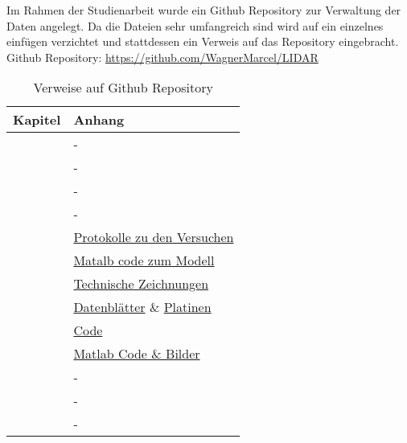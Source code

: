 \newpage
{}
Im Rahmen der Studienarbeit wurde ein Github Repository zur Verwaltung der Daten angelegt. Da die Dateien sehr umfangreich sind wird auf ein einzelnes einfügen verzichtet und stattdessen ein Verweis auf das Repository eingebracht.\\
Github Repository: \href{https://github.com/WagnerMarcel/LIDAR}{https://github.com/WagnerMarcel/LIDAR}
\begin{table}[H]
	\centering
	\caption{Verweise auf Github Repository}
	\begin{tabular}{|l|l|}
		\hline
		\textbf{Kapitel} & \textbf{Anhang} \\\hline
		\fullref{chap:einleitung} & - \\\hline
		\fullref{chap:grundlagen_et} & - \\\hline
		\fullref{chap:grund_lidar} & - \\\hline
		\fullref{chap:stand_der_technik} & -\\\hline
		\fullref{chap:machbarkeitsstudie} & \href{https://github.com/WagnerMarcel/LIDAR/tree/master/04_Protokolle}{Protokolle zu den Versuchen} \\\hline
		\fullref{chap:matlab_modell} & \href{https://github.com/WagnerMarcel/LIDAR/tree/master/06_Matlab\%20Modell}{Matalb code zum Modell} \\\hline
		\fullref{chap:mechanik} & \href{https://github.com/WagnerMarcel/LIDAR/tree/master/08_Mechanik}{Technische Zeichnungen} \\\hline
		\fullref{chap:hardware} & \href{https://github.com/WagnerMarcel/LIDAR/tree/master/05_Datenblätter/VL53L1X}{Datenblätter} \& \href{https://github.com/WagnerMarcel/LIDAR/tree/master/09_Platinen}{Platinen}\\\hline
		\fullref{chap:code} & \href{https://github.com/WagnerMarcel/LIDAR/tree/master/07_Code}{Code} \\\hline
		\fullref{chap:auswertung_matlab} & \href{https://github.com/WagnerMarcel/LIDAR/tree/master/11_Auswertung}{Matlab Code \& Bilder} \\\hline
		\fullref{chap:validierung} & - \\\hline
		\fullref{chap:fazit} & - \\\hline
		\fullref{chap:ausblick} & - \\\hline
	\end{tabular}
\end{table}
